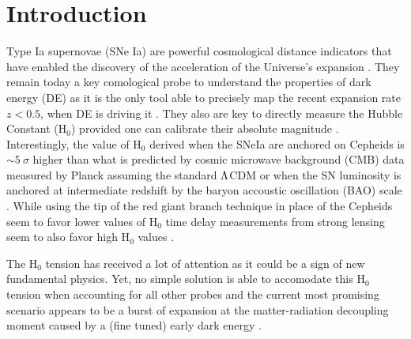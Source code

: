 \documentclass[bibnumber]{aa}
\begin{document}
\section{Introduction}



Type Ia supernovae (SNe Ia) are powerful cosmological distance indicators that
have enabled the discovery of the acceleration of the Universe's expansion
\citep{riess1998, permutter1999}. They remain today a key comological probe to
understand the properties of dark energy (DE) as it is the only tool able to
precisely map the recent expansion rate $z<0.5$, when DE is driving it
\citep[e.g.][]{scolnicastro2020}. They also are key to directly measure the
Hubble Constant (H$_0$) provided one can calibrate their absolute magnitude
\citep{riess2016, freedman2019}. Interestingly, the value of H$_0$ derived when
the SNeIa are anchored on Cepheids \citep[the SH0ES
project][]{riess2009,riess2016} is $\sim5~\sigma$ higher than what is predicted
by cosmic microwave background (CMB) data measured by Planck assuming the
standard $\Lambda$CDM or when the SN luminosity is anchored at intermediate redshift
by the baryon accoustic oscillation (BAO) scale \citep{riess2019, ried2019,
planck, feeney}. While using the tip of the red giant branch technique in place
of the Cepheids seem to favor lower values of H$_0$ \citep{freedman,
recalibrationpaper} time delay measurements from strong lensing seem to also
favor high H$_0$ values \citep{wong2019}.

The H$_0$ tension has received a lot of attention as it could be a sign of new
fundamental physics. Yet, no simple solution is able to accomodate this H$_0$
tension when accounting for all other probes and the current most promising
scenario appears to be a burst of expansion at the matter-radiation decoupling
moment caused by a (fine tuned) early dark energy \citep{poulin}.
\end{document}
